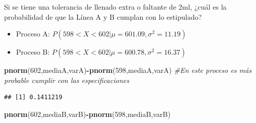 \documentclass[
]{article}
\newenvironment{Shaded}{\begin{snugshade}}{\end{snugshade}}
\newcommand{\AttributeTok}[1]{\textcolor[rgb]{0.13,0.29,0.53}{#1}}
\newcommand{\CommentTok}[1]{\textcolor[rgb]{0.56,0.35,0.01}{\textit{#1}}}
\newcommand{\ConstantTok}[1]{\textcolor[rgb]{0.56,0.35,0.01}{#1}}
\newcommand{\DecValTok}[1]{\textcolor[rgb]{0.00,0.00,0.81}{#1}}
\newcommand{\FunctionTok}[1]{\textcolor[rgb]{0.13,0.29,0.53}{\textbf{#1}}}
\newcommand{\NormalTok}[1]{#1}
\newcommand{\OtherTok}[1]{\textcolor[rgb]{0.56,0.35,0.01}{#1}}
\newcommand{\SpecialCharTok}[1]{\textcolor[rgb]{0.81,0.36,0.00}{\textbf{#1}}}
\providecommand{\tightlist}{%
  \setlength{\itemsep}{0pt}\setlength{\parskip}{0pt}}
\begin{document}
Si se tiene una tolerancia de llenado extra o faltante de 2ml, ¿cuál es
la probabilidad de que la Línea A y B cumplan con lo estipulado?

\begin{itemize}
\tightlist
\item
  Proceso A: \(P(598 < X < 602| \mu = 601.09, \sigma^2=11.19)\)\\
\item
  Proceso B: \(P(598 < X < 602| \mu = 600.78, \sigma^2=16.37)\)
\end{itemize}

\begin{Shaded}
\end{Shaded}

\begin{Shaded}
\begin{Highlighting}[]
\FunctionTok{pnorm}\NormalTok{(}\DecValTok{602}\NormalTok{,mediaA,varA)}\SpecialCharTok{{-}}\FunctionTok{pnorm}\NormalTok{(}\DecValTok{598}\NormalTok{,mediaA,varA) }\CommentTok{\#En este proceso es más probable cumplir con las especificaciones}
\end{Highlighting}
\end{Shaded}

\begin{verbatim}
## [1] 0.1411219
\end{verbatim}

\begin{Shaded}
\begin{Highlighting}[]
\FunctionTok{pnorm}\NormalTok{(}\DecValTok{602}\NormalTok{,mediaB,varB)}\SpecialCharTok{{-}}\FunctionTok{pnorm}\NormalTok{(}\DecValTok{598}\NormalTok{,mediaB,varB)}
\end{Highlighting}
\end{Shaded}
\end{document}
